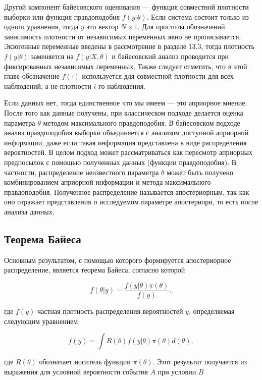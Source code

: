 Другой компонент байесовского оценивания ---  функция совместной плотности выборки или функция правдоподобия $f(y|\theta)$. Если система состоит только из одного уравнения, тогда $y$ это вектор $N{\times}1$. Для простоты обозначений зависимость плотности от независимых переменных явно не прописывается. Экзогенные переменные введены в рассмотрение в разделе 13.3, тогда плотность $f(y|\theta)$ заменяется на $f(y|X,\theta)$ и байесовский анализ проводится при фиксированных независимых переменных. Также следует отметить, что в этой главе обозначение $f(\cdot)$ используется для совместной плотности для всех наблюдений, а не плотности $i$-го наблюдения.

Если данных нет, тогда единственное что мы имеем --- это априорное мнение. После того как данные получены, при классическом подходе делается оценка параметра $\theta$ методом максимального правдоподобия. В байесовском подходе анализ правдоподобия выборки объединяется с анализом доступной априорной информации, даже если такая информация представлена в виде распределения вероятностей. В целом подход может рассматриваться как пересмотр априорных предпосылок с помощью полученных данных (функции правдоподобия). В частности, распределение неизвестного параметра $\theta$ может быть получено комбинированием априорной информации и метода максимального правдоподобия. Полученное распределение называется апостериорным, так как оно отражает представления о исследуемом параметре апостериори, то есть после анализа данных.

\subsection{Теорема Байеса}

Основным результатом, с помощью которого формируется апостериорное распределение, является теорема Байеса, согласно которой

\begin{equation}
f(\theta|y)=\dfrac{f(y|\theta)\pi{(\theta)}}{f(y)},
\end{equation}

где $f(y)$   частная плотность распределения вероятностей $y$, определяемая следующим уравнением

\begin{equation}
f(y)=\int R(\theta)f(y|\theta)\pi{(\theta)}d(\theta),
\end{equation}

где $R(\theta)$ обозначает носитель функции $\pi(\theta)$. Этот результат получается из выражения для условной вероятности события $A$ при условии $B$

